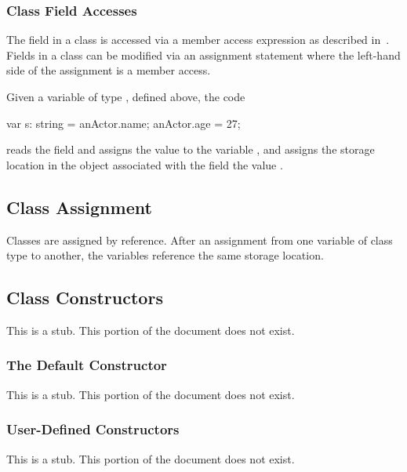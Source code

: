 \subsubsection{Class Field Accesses}
\label{Class_Field_Accesses}

The field in a class is accessed via a member access expression as
described in~.  Fields in a class can
be modified via an assignment statement where the left-hand side of
the assignment is a member access.
\begin{example}
Given a variable  of type , defined above,
the code
\begin{chapel}
var s: string = anActor.name;
anActor.age = 27;
\end{chapel}
reads the field  and assigns the value to the variable
, and assigns the storage location in the object
 associated with the field  the value
.
\end{example}

\subsection{Class Assignment}
\label{Class_Assignment}

Classes are assigned by reference.  After an assignment from one
variable of class type to another, the variables reference the same
storage location.

\subsection{Class Constructors}
\label{Class_Constructors}

This is a stub.  This portion of the document does not exist.

\subsubsection{The Default Constructor}
\label{The_Default_Constructor}

This is a stub.  This portion of the document does not exist.

\subsubsection{User-Defined Constructors}
\label{User-Defined_Constructors}

This is a stub.  This portion of the document does not exist.

